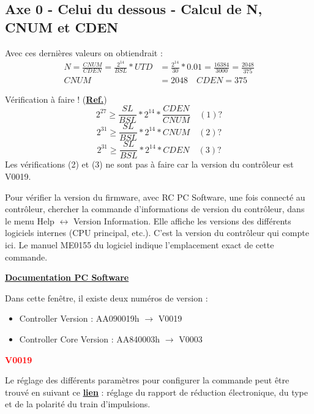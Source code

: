 \documentclass[a4paper,11pt]{beamer}
\begin{document}
\subsection{Axe 0 - Celui du dessous - Calcul de N, CNUM et CDEN}
\begin{frame}
\justifying
Avec ces dernières valeurs on obtiendrait :
\begin{align*}
N = \frac{CNUM}{CDEN} = \frac{2^{14}}{BSL}*UTD &= \frac{2^{14}}{30}*0.01 = \frac{16384}{3000} = \frac{2048}{375} \\
CNUM &= 2048 \quad CDEN = 375
\end{align*}
\begin{alertblock}{Vérification à faire ! (\textcolor{white}{\textbf{\underline{\href{https://raw.githubusercontent.com/fbuloup/Interface_IAI/main/Documentation/SCON-CB_CGB(ME0340-8A).pdf\#page=258}{Ref.}}}})}
$$
2^{27} \geq \frac{SL}{BSL} * 2^{14} * \frac{CDEN}{CNUM}\quad (1)?
$$
$$
2^{31} \geq \frac{SL}{BSL} * 2^{14} * CNUM\quad (2)?
$$
$$
2^{31} \geq \frac{SL}{BSL} * 2^{14} * CDEN\quad (3)?
$$
Les vérifications (2) et (3) ne sont pas à faire car la version du contrôleur est V0019.
\end{alertblock}

\end{frame}

\begin{frame}
\justifying
Pour vérifier la version du firmware, avec RC PC Software, une fois connecté au contrôleur, chercher la commande d'informations de version du contrôleur, dans le menu Help $\leftrightarrow$ Version Information. Elle affiche les versions des différents logiciels internes (CPU principal, etc.). C'est la version du contrôleur qui compte ici. Le manuel ME0155 du logiciel indique l'emplacement exact de cette commande.

\centering \textcolor{blue}{\textbf{\underline{\href{https://raw.githubusercontent.com/fbuloup/Interface_IAI/main/Documentation/RCM-101-MW_USB(ME0155-31A).pdf\#page=203}{Documentation PC Software}}}}	
\vspace{0.25cm}

\centering 
Dans cette fenêtre, il existe deux numéros de version :
\begin{itemize}
	\item Controller Version : AA090019h $\rightarrow$ V0019
	\item Controller Core Version : AA840003h $\rightarrow$ V0003
\end{itemize}
\textcolor{red}{\textbf{V0019}}

\justifying	
Le réglage des différents paramètres pour configurer la commande peut être trouvé en suivant ce 
\textcolor{blue}{\textbf{\underline{\href{https://raw.githubusercontent.com/fbuloup/Interface_IAI/main/Documentation/SCON-CB_CGB(ME0340-8A).pdf\#page=257}{lien}}}} : réglage du rapport de réduction électronique, du type et de la polarité du train d'impulsions.
\end{frame}
\end{document}
